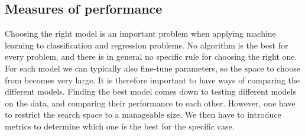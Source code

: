 \subsection{Measures of performance}
Choosing the right model is an important problem when applying machine learning to classification and regression problems. No algorithm is the best for every problem, and there is in general no specific rule for choosing the right one. For each model we can typically also fine-tune parameters, so the space to choose from becomes very large. It is therefore important to have ways of comparing the different models. Finding the best model comes down to testing different models on the data, and comparing their performance to each other. However, one have to restrict the search space to a manageable size.  We then have to introduce metrics to determine which one is the best for the specific case.  
